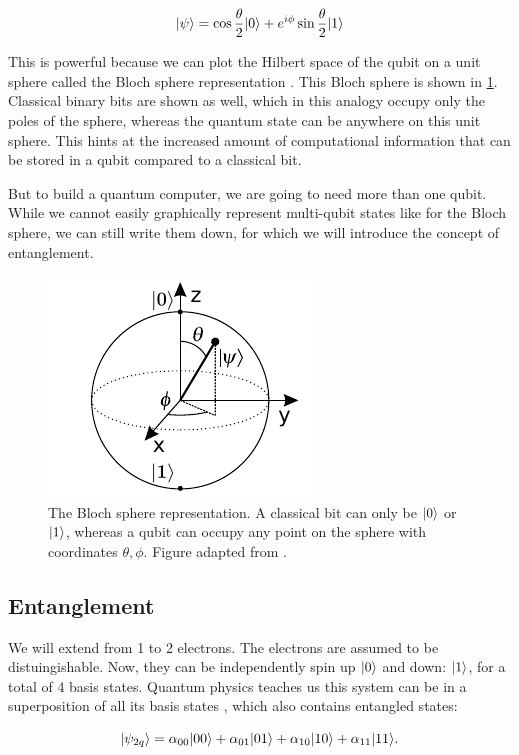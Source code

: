 \begin{equation}\label{eq:BlochSphere}
	\lvert\psi\rangle = 
	\cos{\frac{\theta}{2}} \lvert0\rangle + e^{i \phi} \sin{\frac{\theta}{2}} \lvert1\rangle
\end{equation}

This is powerful because we can plot the Hilbert space of the qubit on a unit sphere called the Bloch sphere representation \cite{Nielsen2011}.
This Bloch sphere is shown in \cref{fig:BlochSphere}.
Classical binary bits are shown as well, which in this analogy occupy only the poles of the sphere, whereas the quantum state can be anywhere on this unit sphere. 
This hints at the increased amount of computational information that can be stored in a qubit compared to a classical bit. 

But to build a quantum computer, we are going to need more than one qubit. 
While we cannot easily graphically represent multi-qubit states like for the Bloch sphere, we can still write them down, for which we will introduce the concept of entanglement.

\begin{figure}
	\centering
	\includegraphics[width=.28\linewidth]{figures/BlochSphereCropped.pdf}
	\caption{The Bloch sphere representation. A classical bit can only be $\lvert0\rangle$ or $\lvert1\rangle$, whereas a qubit can occupy any point on the sphere with coordinates $\theta, \phi$. Figure adapted from \cite{Jones2012}.}
	\label{fig:BlochSphere}
\end{figure}

\subsection{Entanglement}\label{sub:Entanglement}

We will extend from 1 to 2 electrons. 
The electrons are assumed to be distuingishable. 
Now, they can be independently spin up $\lvert0\rangle$ and down: $\lvert1\rangle$, for a total of 4 basis states.
Quantum physics teaches us this system can be in a superposition of all its basis states \cite{Nielsen2011}, which also contains entangled states:

\begin{equation}\label{eq:TwoQubits}
	\lvert\psi_{2q}\rangle = 
	\alpha_{00} \lvert00\rangle + \alpha_{01} \lvert01\rangle + \alpha_{10} \lvert10\rangle + \alpha_{11} \lvert11\rangle.
\end{equation}

